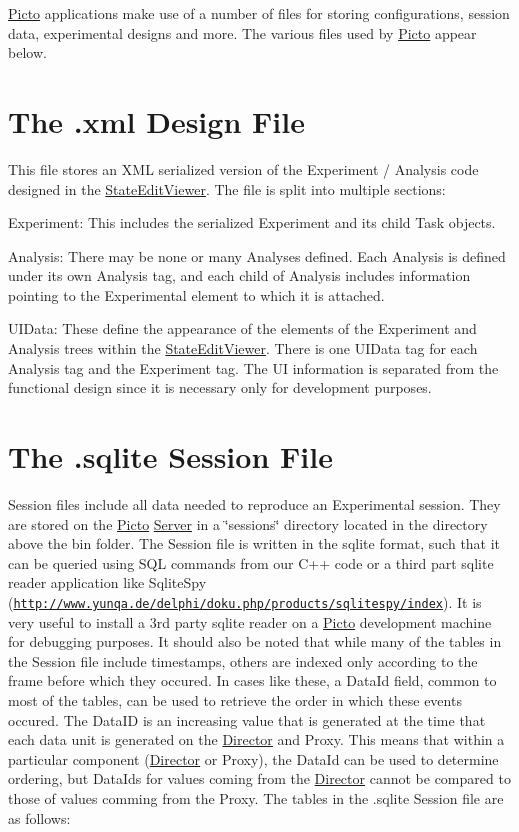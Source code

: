 \hyperlink{namespace_picto}{Picto} applications make use of a number of files for storing configurations, session data, experimental designs and more. The various files used by \hyperlink{namespace_picto}{Picto} appear below.\hypertarget{user_files_design_file}{}\section{The .\-xml Design File}\label{user_files_design_file}
This file stores an X\-M\-L serialized version of the Experiment / Analysis code designed in the \hyperlink{class_state_edit_viewer}{State\-Edit\-Viewer}. The file is split into multiple sections\-:
\begin{DoxyItemize}
\item Experiment\-: This includes the serialized Experiment and its child Task objects.
\item Analysis\-: There may be none or many Analyses defined. Each Analysis is defined under its own Analysis tag, and each child of Analysis includes information pointing to the Experimental element to which it is attached.
\item U\-I\-Data\-: These define the appearance of the elements of the Experiment and Analysis trees within the \hyperlink{class_state_edit_viewer}{State\-Edit\-Viewer}. There is one U\-I\-Data tag for each Analysis tag and the Experiment tag. The U\-I information is separated from the functional design since it is necessary only for development purposes.
\end{DoxyItemize}\hypertarget{user_files_session_file}{}\section{The .\-sqlite Session File}\label{user_files_session_file}
Session files include all data needed to reproduce an Experimental session. They are stored on the \hyperlink{namespace_picto}{Picto} \hyperlink{class_server}{Server} in a \char`\"{}sessions\char`\"{} directory located in the directory above the bin folder. The Session file is written in the sqlite format, such that it can be queried using S\-Q\-L commands from our C++ code or a third part sqlite reader application like Sqlite\-Spy (\href{http://www.yunqa.de/delphi/doku.php/products/sqlitespy/index}{\tt http\-://www.\-yunqa.\-de/delphi/doku.\-php/products/sqlitespy/index}). It is very useful to install a 3rd party sqlite reader on a \hyperlink{namespace_picto}{Picto} development machine for debugging purposes. It should also be noted that while many of the tables in the Session file include timestamps, others are indexed only according to the frame before which they occured. In cases like these, a Data\-Id field, common to most of the tables, can be used to retrieve the order in which these events occured. The Data\-I\-D is an increasing value that is generated at the time that each data unit is generated on the \hyperlink{class_director}{Director} and Proxy. This means that within a particular component (\hyperlink{class_director}{Director} or Proxy), the Data\-Id can be used to determine ordering, but Data\-Ids for values coming from the \hyperlink{class_director}{Director} cannot be compared to those of values comming from the Proxy. The tables in the .sqlite Session file are as follows\-:
